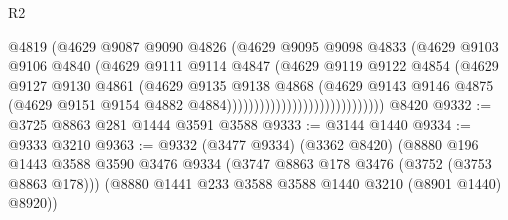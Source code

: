 \begin{lexlean}{R2}
\begin{coremodule}
                                            @4819
                                            (@4629
                                              @9087
                                              @9090
                                              @4826
                                              (@4629
                                                @9095
                                                @9098
                                                @4833
                                                (@4629
                                                  @9103
                                                  @9106
                                                  @4840
                                                  (@4629
                                                    @9111
                                                    @9114
                                                    @4847
                                                    (@4629
                                                      @9119
                                                      @9122
                                                      @4854
                                                      (@4629
                                                        @9127
                                                        @9130
                                                        @4861
                                                        (@4629
                                                          @9135
                                                          @9138
                                                          @4868
                                                          (@4629
                                                            @9143
                                                            @9146
                                                            @4875
                                                            (@4629
                                                              @9151
                                                              @9154
                                                              @4882
                                                              @4884)))))))))))))))))))))))))))))
    @8420
@9332 := @3725 @8863 @281 @1444 @3591 @3588
@9333 := @3144 @1440
@9334 := @9333 @3210
@9363 := @9332
    (@3477 @9334)
    (@3362 @8420)
    (@8880
      @196
      @1443
      @3588
      @3590
      @3476
      @9334
      (@3747 @8863 @178 @3476 (@3752 (@3753 @8863 @178)))
      (@8880 @1441 @233 @3588 @3588 @1440 @3210 (@8901 @1440) @8920))

\end{coremodule}
\end{lexlean}
